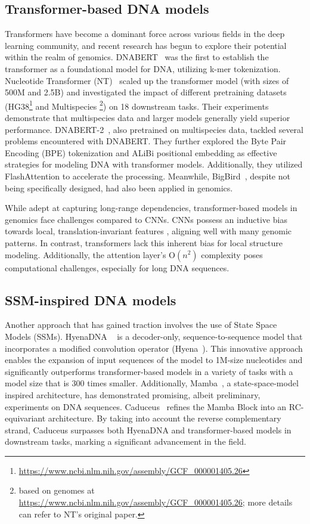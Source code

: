 \subsection{Transformer-based DNA models}
Transformers have become a dominant force across various fields in the deep learning community, and recent research has begun to explore their potential within the realm of genomics. DNABERT~\citep{ji2021dnabert} was the first to establish the transformer as a foundational model for DNA, utilizing k-mer tokenization. Nucleotide Transformer (NT)~\citep{dalla2023nucleotide} scaled up the transformer model (with sizes of 500M and 2.5B) and investigated the impact of different pretraining datasets (HG38\footnote
{\url{https://www.ncbi.nlm.nih.gov/assembly/GCF_000001405.26}} and Multispecies%
\footnote
{based on genomes %
at 
\url{https://www.ncbi.nlm.nih.gov/assembly/GCF_000001405.26}; %
more details can refer to NT's original paper.}) on 18 downstream tasks. Their experiments demonstrate that multispecies data and larger models generally yield superior performance. DNABERT-2~\citep{zhou2023dnabert}, also pretrained on multispecies data, tackled several problems encountered with DNABERT. 
They further explored the Byte Pair Encoding (BPE) tokenization and ALiBi positional embedding as effective strategies for modeling DNA with transformer models. Additionally, they utilized FlashAttention to accelerate the processing. Meanwhile, BigBird~\citep{zaheer2020big}, despite not being specifically designed, had also been applied in genomics.

While adept at capturing long-range dependencies, transformer-based models in genomics face challenges compared to CNNs. CNNs possess an inductive bias towards local, translation-invariant features \citep{battaglia2018relational}, aligning well with many genomic patterns.
In contrast, transformers lack this inherent bias for local structure modeling. Additionally, the attention layer's O${(n^2)}$ complexity poses computational challenges, especially for long DNA sequences.

\subsection{SSM-inspired DNA models}
Another approach that has gained traction involves the use of State Space Models (SSMs). HyenaDNA ~\citep{nguyen2024hyenadna} is a decoder-only, sequence-to-sequence model that incorporates a modified convolution operator (Hyena~\citep{poli2023hyena}). This innovative approach enables the expansion of input sequences of the model to 1M-size nucleotides and significantly outperforms transformer-based models in a variety of tasks with a model size that is 300 times smaller. Additionally, Mamba~\citep{gu2023mamba}, a state-space-model inspired architecture, has demonstrated promising, albeit preliminary, experiments on DNA sequences. Caduceus~\citep{schiff2024caduceus} refines the Mamba Block into an RC-equivariant architecture. By taking into account the reverse complementary strand, Caduceus surpasses both HyenaDNA and transformer-based models in downstream tasks, marking a significant advancement in the field. 

